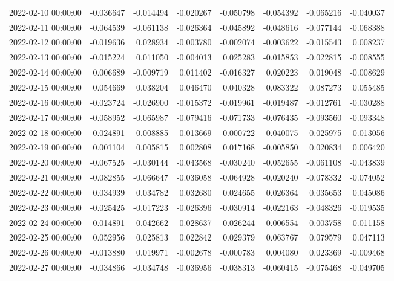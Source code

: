 \begin{tabular}{lrrrrrrr}
2022-02-10 00:00:00 & -0.036647 & -0.014494 & -0.020267 & -0.050798 & -0.054392 & -0.065216 & -0.040037 \\
2022-02-11 00:00:00 & -0.064539 & -0.061138 & -0.026364 & -0.045892 & -0.048616 & -0.077144 & -0.068388 \\
2022-02-12 00:00:00 & -0.019636 & 0.028934 & -0.003780 & -0.002074 & -0.003622 & -0.015543 & 0.008237 \\
2022-02-13 00:00:00 & -0.015224 & 0.011050 & -0.004013 & 0.025283 & -0.015853 & -0.022815 & -0.008555 \\
2022-02-14 00:00:00 & 0.006689 & -0.009719 & 0.011402 & -0.016327 & 0.020223 & 0.019048 & -0.008629 \\
2022-02-15 00:00:00 & 0.054669 & 0.038204 & 0.046470 & 0.040328 & 0.083322 & 0.087273 & 0.055485 \\
2022-02-16 00:00:00 & -0.023724 & -0.026900 & -0.015372 & -0.019961 & -0.019487 & -0.012761 & -0.030288 \\
2022-02-17 00:00:00 & -0.058952 & -0.065987 & -0.079416 & -0.071733 & -0.076435 & -0.093560 & -0.093348 \\
2022-02-18 00:00:00 & -0.024891 & -0.008885 & -0.013669 & 0.000722 & -0.040075 & -0.025975 & -0.013056 \\
2022-02-19 00:00:00 & 0.001104 & 0.005815 & 0.002808 & 0.017168 & -0.005850 & 0.020834 & 0.006420 \\
2022-02-20 00:00:00 & -0.067525 & -0.030144 & -0.043568 & -0.030240 & -0.052655 & -0.061108 & -0.043839 \\
2022-02-21 00:00:00 & -0.082855 & -0.066647 & -0.036058 & -0.064928 & -0.020240 & -0.078332 & -0.074052 \\
2022-02-22 00:00:00 & 0.034939 & 0.034782 & 0.032680 & 0.024655 & 0.026364 & 0.035653 & 0.045086 \\
2022-02-23 00:00:00 & -0.025425 & -0.017223 & -0.026396 & -0.030914 & -0.022163 & -0.048326 & -0.019535 \\
2022-02-24 00:00:00 & -0.014891 & 0.042662 & 0.028637 & -0.026244 & 0.006554 & -0.003758 & -0.011158 \\
2022-02-25 00:00:00 & 0.052956 & 0.025813 & 0.022842 & 0.029379 & 0.063767 & 0.079579 & 0.047113 \\
2022-02-26 00:00:00 & -0.013880 & 0.019971 & -0.002678 & -0.000783 & 0.004080 & 0.023369 & -0.009468 \\
2022-02-27 00:00:00 & -0.034866 & -0.034748 & -0.036956 & -0.038313 & -0.060415 & -0.075468 & -0.049705 \\

\end{tabular}
